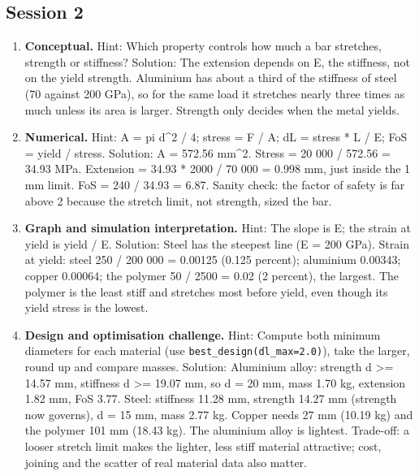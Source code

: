 \documentclass[11pt,a4paper]{article}
\begin{document}
\subsection*{Session 2}
\begin{enumerate}[nosep]
\item \textbf{Conceptual.} Hint: Which property controls how much a bar stretches, strength or stiffness? Solution: The extension depends on E, the stiffness, not on the yield strength. Aluminium has about a third of the stiffness of steel (70 against 200 GPa), so for the same load it stretches nearly three times as much unless its area is larger. Strength only decides when the metal yields.
\item \textbf{Numerical.} Hint: A = pi d\textasciicircum{}2 / 4; stress = F / A; dL = stress * L / E; FoS = yield / stress. Solution: A = 572.56 mm\textasciicircum{}2. Stress = 20 000 / 572.56 = 34.93 MPa. Extension = 34.93 * 2000 / 70 000 = 0.998 mm, just inside the 1 mm limit. FoS = 240 / 34.93 = 6.87. Sanity check: the factor of safety is far above 2 because the stretch limit, not strength, sized the bar.
\item \textbf{Graph and simulation interpretation.} Hint: The slope is E; the strain at yield is yield / E. Solution: Steel has the steepest line (E = 200 GPa). Strain at yield: steel 250 / 200 000 = 0.00125 (0.125 percent); aluminium 0.00343; copper 0.00064; the polymer 50 / 2500 = 0.02 (2 percent), the largest. The polymer is the least stiff and stretches most before yield, even though its yield stress is the lowest.
\item \textbf{Design and optimisation challenge.} Hint: Compute both minimum diameters for each material (use \texttt{best\_design(dl\_max=2.0)}), take the larger, round up and compare masses. Solution: Aluminium alloy: strength d \textgreater{}= 14.57 mm, stiffness d \textgreater{}= 19.07 mm, so d = 20 mm, mass 1.70 kg, extension 1.82 mm, FoS 3.77. Steel: stiffness 11.28 mm, strength 14.27 mm (strength now governs), d = 15 mm, mass 2.77 kg. Copper needs 27 mm (10.19 kg) and the polymer 101 mm (18.43 kg). The aluminium alloy is lightest. Trade-off: a looser stretch limit makes the lighter, less stiff material attractive; cost, joining and the scatter of real material data also matter.
\end{enumerate}
\end{document}
